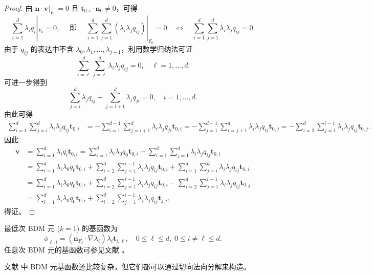 \begin{proof}
由 $\boldsymbol n\cdot \boldsymbol v|_{F_0}=0$ 且 $\boldsymbol t_{0,i}\cdot \boldsymbol n_0\neq0$，可得
\[
\sum_{i=1}^{d} \lambda_i q_i|_{F_0} = 0,
\quad
\textrm{ 即 }
\quad
\sum_{i=1}^{d}\sum_{j=1}^{d}(\lambda_i \lambda_j q_{ij})|_{F_0} = 0 \quad\Leftrightarrow\quad \sum_{i=1}^{d}\sum_{j=1}^{d}\lambda_i \lambda_j q_{ij} = 0.
\]
由于 $q_{ij}$ 的表达中不含 $\lambda_0, \lambda_1, \ldots, \lambda_{j-1}$，利用数学归纳法可证
\[
\sum_{i=\ell}^{d}\sum_{j=\ell}^{d}\lambda_i \lambda_j q_{ij} = 0,\quad \ell=1,\dots,d.
\]
可进一步得到
\[
\sum_{j=i}^{d} \lambda_j q_{ij} + \sum_{j=i+1}^{d} \lambda_j q_{ji} = 0, \quad i=1,\dots,d.
\]
由此可得
\begin{align*}
\sum_{i=1}^{d}\sum_{j=i}^{d} \lambda_i \lambda_j q_{ij} \boldsymbol t_{0,i}
&= - \sum_{i=1}^{d-1}\sum_{j=i+1}^{d} \lambda_i \lambda_j q_{ji} \boldsymbol t_{0,i}
= - \sum_{j=1}^{d-1}\sum_{i=j+1}^{d} \lambda_i \lambda_j q_{ij} \boldsymbol t_{0,j} 
= - \sum_{i=2}^{d}\sum_{j=1}^{i-1} \lambda_i \lambda_j q_{ij} \boldsymbol t_{0,j}.
\end{align*}
因此
\begin{align*}
\boldsymbol v&=\sum_{i=1}^{d}\lambda_i q_i\boldsymbol t_{0,i} = \sum_{i=1}^{d}\lambda_i \lambda_{0}q_{0}\boldsymbol t_{0,i} + \sum_{i=1}^{d}\sum_{j=1}^{d}\lambda_i\lambda_jq_{ij}\boldsymbol t_{0,i} \\
&= \sum_{i=1}^{d}\lambda_i \lambda_{0}q_{0}\boldsymbol t_{0,i}
+ \sum_{i=2}^{d}\sum_{j=1}^{i-1}\lambda_i\lambda_jq_{ij}\boldsymbol t_{0,i} + \sum_{i=1}^{d}\sum_{j=i}^{d}\lambda_i\lambda_jq_{ij}\boldsymbol t_{0,i} \\
&= \sum_{i=1}^{d}\lambda_i \lambda_{0}q_{0}\boldsymbol t_{0,i}
+ \sum_{i=2}^{d}\sum_{j=1}^{i-1}\lambda_i\lambda_jq_{ij}\boldsymbol t_{0,i} -\sum_{i=2}^{d}\sum_{j=1}^{i-1}\lambda_i\lambda_jq_{ij}\boldsymbol t_{0,j} \\
&= \sum_{i=1}^{d}\lambda_i \lambda_{0}q_{0}\boldsymbol t_{0,i}
+ \sum_{i=2}^{d}\sum_{j=1}^{i-1}\lambda_i\lambda_jq_{ij}\boldsymbol t_{j,i},
\end{align*}
得证。
\end{proof}


最低次 BDM 元 ($k=1$) 的基函数为 \cite[Section 2.6]{BoffiBrezziFortin2013}
$$
\phi_{\ell,i}=(\boldsymbol{n}_{F_{\ell}}\cdot\nabla\lambda_{\ell})\lambda_i\boldsymbol{t}_{i,\ell},\quad 0\leq \ell \leq d,\; 0\leq i\neq \ell \leq d.
$$
任意次 BDM 元的基函数可参见文献 \cite[Section 9, Table 9.1, Table 9.4]{ArnoldFalkWinther2009}。

文献 \cite{ArnoldFalkWinther2009} 中 BDM 元基函数还比较复杂，但它们都可以通过切向法向分解来构造。


